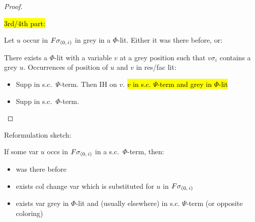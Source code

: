 \documentclass[,%
	draft=false,%
	numbers=noendperiod
	12pt,
	a4paper,
	oneside,%
	openany,
]{memoir}
\begin{document}
\begin{proof}
	~

	\hl{3rd/4th part:} 

	Let $u$ occur in $F\sigma_{(0,\,i)}$ in grey in a $\Phi$-lit. 
	Either it was there before, or:

	There exists a $\Phi$-lit with a variable $v$ at a grey position such that $v\sigma_i$ contains a grey $u$.
	Occurrences of position of $u$ and $v$ in res/fac lit:

	\begin{itemize}
		\item Supp in s.c.\ $\Psi$-term. Then IH on $v$. \hl{$v$ in s.c. $\Psi$-term and grey in $\Phi$-lit}
		\item Supp in s.c.\ $\Phi$-term. 
	\end{itemize}

\end{proof}

Reformulation sketch:

If some var $u$ occs in $F\sigma_{(0,\,i)}$ in a s.c.\ $\Phi$-term, then:
\begin{itemize}
	\item was there before
	\item exists col change var which is substituted for $u$ in $F\sigma_{(0,\,i)}$
	\item exists var grey in $\Phi$-lit and (usually elsewhere) in s.c. $\Psi$-term (or opposite coloring)
\end{itemize}

~
\end{document}
